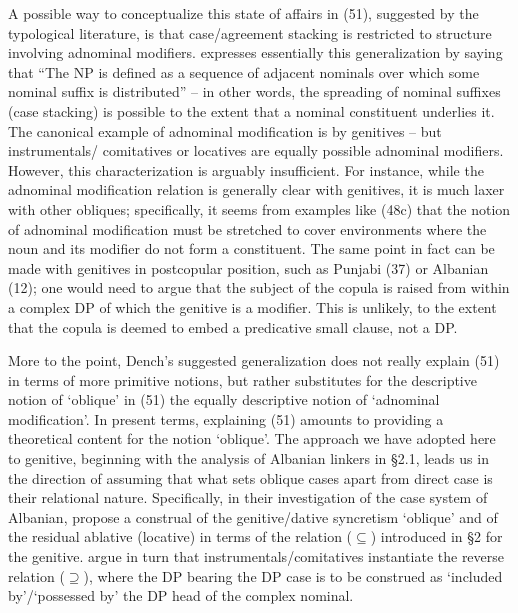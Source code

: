 \documentclass[output=paper]{langsci/langscibook}
\begin{document}
A possible way to conceptualize this state of affairs in (51), suggested by the typological literature, is that case/agreement stacking is restricted to structure involving adnominal modifiers. \citet[386]{Dench1995} expresses essentially this generalization by saying that “The NP is defined as a sequence of adjacent nominals over which some nominal suffix is distributed” – in other words, the spreading of nominal suffixes (case stacking) is possible to the extent that a nominal constituent underlies it. The canonical example of adnominal modification is by genitives – but instrumentals/ comitatives or locatives are equally possible adnominal modifiers. However, this characterization is arguably insufficient. For instance, while the adnominal modification relation is generally clear with genitives, it is much laxer with other obliques; specifically, it seems from examples like (48c) that the notion of adnominal modification must be stretched to cover environments where the noun and its modifier do not form a constituent. The same point in fact can be made with genitives in postcopular position, such as Punjabi (37) or Albanian (12); one would need to argue that the subject of the copula is raised from within a complex DP of which the genitive is a modifier. This is unlikely, to the extent that the copula is deemed to embed a predicative small clause, not a DP.

More to the point, Dench’s suggested generalization does not really explain (51) in terms of more primitive notions, but rather substitutes for the descriptive notion of ‘oblique’ in (51) the equally descriptive notion of ‘adnominal modification’. In present terms, explaining (51) amounts to providing a theoretical content for the notion ‘oblique’. The approach we have adopted here to genitive, beginning with the analysis of Albanian linkers in §2.1, leads us in the direction of assuming that what sets oblique cases apart from direct case is their relational nature. Specifically, in their investigation of the case system of Albanian, \citet{Manzini2011a,Manzini2011b} propose a construal of the genitive/dative syncretism ‘oblique’ and of the residual ablative (locative) in terms of the relation ($\subseteq$) introduced in §2 for the genitive. \citet{Franco2015} argue in turn that instrumentals/comitatives instantiate the reverse relation ($\supseteq$), where the DP bearing the DP case is to be construed as ‘included by’/‘possessed by’ the DP head of the complex nominal. 
\end{document}
